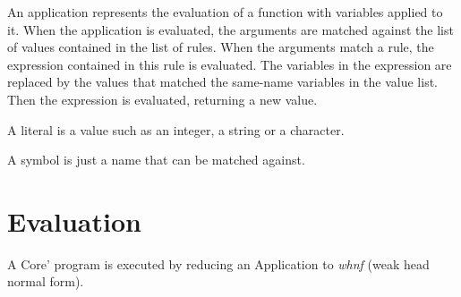 An application represents the evaluation of a function with variables applied to it.
When the application is evaluated, the arguments are matched against the list of 
values contained in the list of rules. 
When the arguments match a rule, the expression contained in this rule is evaluated. 
The variables in the expression are replaced by the values that matched the same-name
variables in the value list. Then the expression is evaluated, returning a new value.


A literal is a value such as an integer, a string or a character.


A symbol is just a name that can be matched against.


\section{Evaluation}

A Core' program is executed by reducing an Application to \emph{whnf} (weak head normal form).



